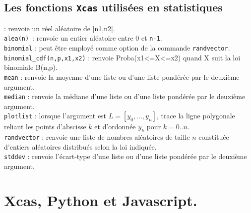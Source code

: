 \documentclass[12pt,a4paper]{book}
\begin{document}
\begin{giacjshere}
\section{Les fonctions {\tt Xcas} utilis\'ees en statistiques}
 : renvoie un r\'eel al\'eatoire de [n1,n2[.\\
{\tt alea(n)}~: renvoie un entier al\'eatoire entre 0 et {\tt n-1}.
\\
{\tt binomial} : peut \^etre employ\'e comme option de la commande {\tt randvector}.\\
{\tt binomial\_cdf(n,p,x1,x2)} : renvoie Proba(x1<=X<=x2) quand X suit la loi 
binomiale B(n,p).\\
{\tt mean} : renvoie la moyenne d'une liste ou d'une liste pond\'er\'ee par le 
deuxi\`eme argument.\\
{\tt median} : renvoie la m\'ediane d'une liste ou d'une liste pond\'er\'ee par 
le deuxi\`eme argument.\\ 
{\tt plotlist} : lorsque l'argument est $L=[y_0,...,y_n]$, trace la ligne 
polygonale reliant les points d'abscisse $k$ et d'ordonn\'ee $y_k$ pour 
$k=0..n$.\\
{\tt randvector} : renvoie une liste de nombres al\'eatoires de taille $n$ 
constitu\'ee d'entiers al\'eatoires distribu\'es selon la loi indiqu\'ee.\\
{\tt stddev} : renvoie l'\'ecart-type d'une liste ou d'une liste pond\'er\'ee
 par le deuxi\`eme argument.\\

\appendix \label{sec;python}

\chapter{Xcas, Python et Javascript.}


\end{giacjshere}
\end{document}
